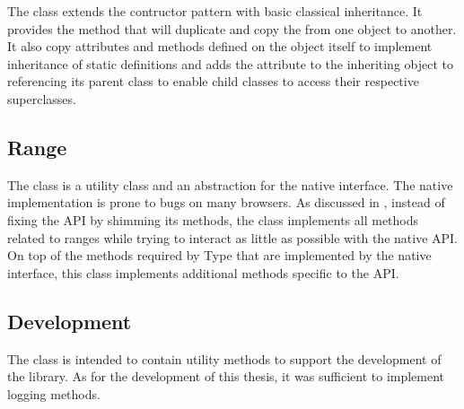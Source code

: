 The  class extends the contructor pattern with basic classical inheritance. It provides the method  that will duplicate and copy the  from one  object to another. It also copy attributes and methods defined on the  object itself to implement inheritance of static definitions and adds the attribute  to the inheriting  object to referencing its parent class to enable child classes to access their respective superclasses.




\subsection{Range}

The  class is a utility class and an abstraction for the native  interface. The native implementation is prone to bugs on many browsers. As discussed in , instead of fixing the API by shimming its methods, the  class implements all methods related to ranges while trying to interact as little as possible with the native API. On top of the methods required by Type that are implemented by the native  interface, this class implements additional methods specific to the API.





\subsection{Development}

The  class is intended to contain utility methods to support the development of the library. As for the development of this thesis, it was sufficient to implement logging methods.

